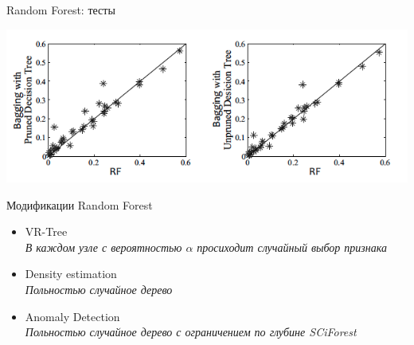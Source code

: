 \documentclass[10pt,a4paper]{beamer}
\begin{document}

\begin{frame}{Random Forest: тесты}

\begin{center}
\includegraphics[scale=0.5]{images/rf.png}
\end{center}

\end{frame}


\begin{frame}{Модификации Random Forest}

\begin{itemize}
\item VR-Tree \\
{\it В каждом узле с вероятностью $\alpha$ просиходит случайный выбор признака}
\item Density estimation \\
{\it Польностью случайное дерево}
\item Anomaly Detection \\
{\it Польностью случайное дерево с ограничением по глубине SCiForest}
\end{itemize}

\end{frame}

\end{document}

